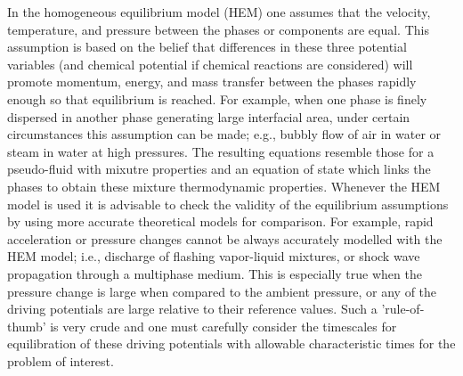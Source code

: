 In the homogeneous equilibrium model (HEM) one assumes that the velocity, temperature, and pressure between the phases or components are equal.
This assumption is based on the belief that differences in these three potential variables (and chemical potential if chemical reactions are considered) will promote momentum, energy, and mass transfer between the phases rapidly enough so that equilibrium is reached.
For example, when one phase is finely dispersed in another phase generating large interfacial area, under certain circumstances this assumption can be made; e.g., bubbly flow of air in water or steam in water at high pressures.
The resulting equations resemble those for a pseudo-fluid with mixutre properties and an equation of state which links the phases to obtain these mixture thermodynamic properties.
Whenever the HEM model is used it is advisable to check the validity of the equilibrium assumptions by using more accurate theoretical models for comparison.
For example, rapid acceleration or pressure changes cannot be always accurately modelled with the HEM model; i.e., discharge of flashing vapor-liquid mixtures, or shock wave propagation through a multiphase medium.
This is especially true when the pressure change is large when compared to the ambient pressure, or any of the driving potentials are large relative to their reference values.
Such a 'rule-of-thumb' is very crude and one must carefully consider the timescales for equilibration of these driving potentials with allowable characteristic times for the problem of interest.


